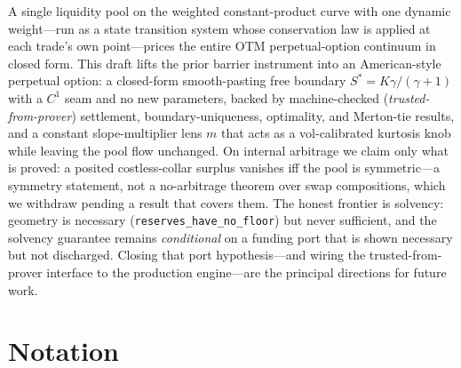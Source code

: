\documentclass[runningheads]{llncs}
\newcommand{\tfp}{\emph{trusted-from-prover}}
\begin{document}
A single liquidity pool on the weighted constant-product curve with one dynamic
weight---run as a state transition system whose conservation law is applied at
each trade's own point---prices the entire OTM perpetual-option continuum in
closed form. This draft lifts the prior barrier instrument into an American-style
perpetual option: a closed-form smooth-pasting free boundary
$S^{\ast}=K\gamma/(\gamma+1)$ with a $C^{1}$ seam and no new parameters, backed by
machine-checked (\tfp{}) settlement, boundary-uniqueness, optimality, and
Merton-tie results, and a constant slope-multiplier lens $m$ that acts as a
vol-calibrated kurtosis knob while leaving the pool flow unchanged. On internal
arbitrage we claim only what is proved: a posited costless-collar surplus
vanishes iff the pool is symmetric---a symmetry statement, not a no-arbitrage
theorem over swap compositions, which we withdraw pending a result that covers
them. The honest frontier is solvency: geometry is necessary
(\texttt{reserves\_have\_no\_floor}) but never sufficient, and the solvency
guarantee remains \emph{conditional} on a funding port that is shown necessary but
not discharged. Closing that port hypothesis---and wiring the trusted-from-prover interface
to the production engine---are the principal directions for future work.

\appendix
\section{Notation}\label{app:notation}
\end{document}
